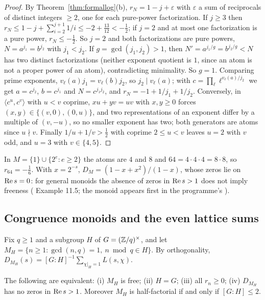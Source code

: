 \begin{proof}
By Theorem~\ref{thm:formallog}(b), $r_N=1-j+\varepsilon$ with $\varepsilon$ a sum of reciprocals of distinct integers $\ge2$, one for each pure-power factorization. If $j\ge3$ then $r_N\le1-j+\sum_{i=2}^{j+1}1/i\le-2+\tfrac{13}{12}<-\tfrac12$; if $j=2$ and at most one factorization is a pure power, $r_N\le-\tfrac12$. So $j=2$ and both factorizations are pure powers, $N=a^{j_1}=b^{j_2}$ with $j_1<j_2$.
If $g=\gcd(j_1,j_2)>1$, then $N'=a^{j_1/g}=b^{j_2/g}<N$ has two distinct factorizations (neither exponent quotient is $1$, since an atom is not a proper power of an atom), contradicting minimality. So $g=1$. Comparing prime exponents, $v_\ell(a)j_1=v_\ell(b)j_2$, so $j_2\mid v_\ell(a)$; with $c=\prod_\ell\ell^{v_\ell(a)/j_2}$ we get $a=c^{j_2}$, $b=c^{j_1}$ and $N=c^{j_1j_2}$, and $r_N=-1+1/j_1+1/j_2$.
Conversely, in $\langle c^u,c^v\rangle$ with $u<v$ coprime, $xu+yv=uv$ with $x,y\ge0$ forces $(x,y)\in\{(v,0),(0,u)\}$, and two representations of an exponent differ by a multiple of $(v,-u)$, so no smaller exponent has two; both generators are atoms since $u\nmid v$.
Finally $1/u+1/v>\tfrac12$ with coprime $2\le u<v$ leaves $u=2$ with $v$ odd, and $u=3$ with $v\in\{4,5\}$.
\end{proof}

\begin{example}
In $M=\{1\}\cup\{2^e:e\ge2\}$ the atoms are $4$ and $8$ and $64=4\cdot4\cdot4=8\cdot8$, so $r_{64}=-\tfrac16$. With $x=2^{-s}$, $D_M=(1-x+x^2)/(1-x)$, whose zeros lie on $\operatorname{Re} s=0$: for general monoids the absence of zeros in $\operatorname{Re} s>1$ does not imply freeness ( Example 11.5; the monoid appears first in the programme's ).
\end{example}

\subsection{Congruence monoids and the even lattice sums}

Fix $q\ge1$ and a subgroup $H$ of $G=(\mathbb{Z}/q)^\times$, and let $M_H=\{n\ge1:\gcd(n,q)=1,\ n\bmod q\in H\}$. By orthogonality, $D_{M_H}(s)=[G:H]^{-1}\sum_{\chi|_H=1}L(s,\chi)$.

\begin{proposition}\label{prop:congruence}
The following are equivalent: (i) $M_H$ is free; (ii) $H=G$; (iii) all $r_n\ge0$; (iv) $D_{M_H}$ has no zeros in $\operatorname{Re} s>1$.
Moreover $M_H$ is half-factorial if and only if $[G:H]\le2$.
\end{proposition}

